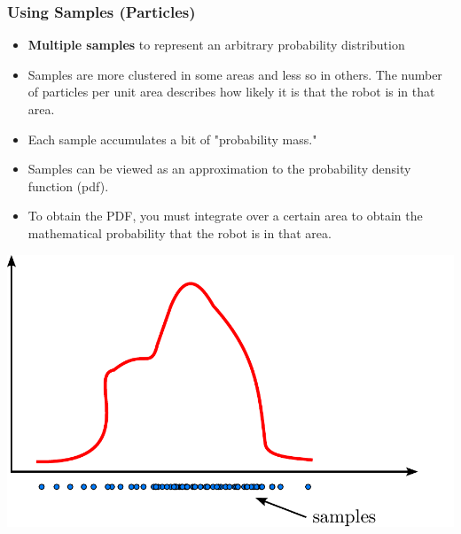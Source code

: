     \begin{frame}
    \frametitle{Using Samples (Particles)}
    \footnotesize
    \begin{itemize}
    \item \textbf{Multiple samples} to represent an arbitrary probability distribution
    \item Samples are more clustered in some areas and less so in others. The number of particles per unit area describes how likely it is that the robot is in that area.
    \item Each sample accumulates a bit of "probability mass."
    \item Samples can be viewed as an approximation to the probability density function (pdf).
    \item To obtain the PDF, you must integrate over a certain area to obtain the mathematical probability that the robot is in that area.
    \end{itemize}
    
    \begin{center}
    \includegraphics[width=0.5\columnwidth]{./images/particle_filter/arbitrary_distribution_samples.pdf}
    \end{center}
    
    \end{frame}
    
